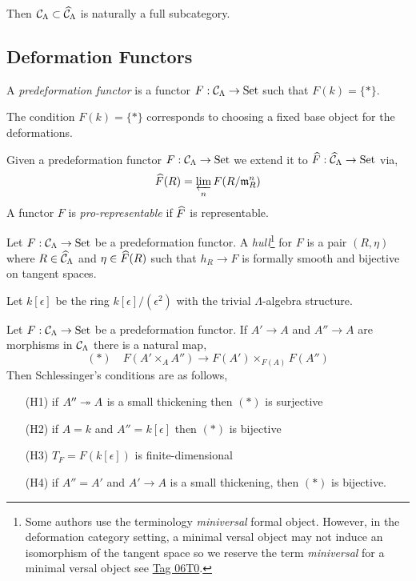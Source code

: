 \documentclass[12pt]{article}
\begin{document}
\begin{rmk}
Then $\mathcal{C}_{\Lambda} \subset \widehat{\mathcal{C}}_{\Lambda}$ is naturally a full subcategory. 
\end{rmk}

\subsection{Deformation Functors}

\begin{defn}
A \textit{predeformation functor} is a functor $F : \mathcal{C}_{\Lambda} \to \mathrm{Set}$ such that $F(k) = \{ * \}$.
\end{defn}

\begin{rmk}
The condition $F(k) = \{ * \}$ corresponds to choosing a fixed base object for the deformations.
\end{rmk}

\begin{defn}
Given a predeformation functor $F : \mathcal{C}_{\Lambda} \to \mathrm{Set}$ we extend it to $\widehat{F} : \widehat{\mathcal{C}}_{\Lambda} \to \mathrm{Set}$ via,
\[ \widehat{F}(R) = \varprojlim_n F(R/\mathfrak{m}_R^n) \]
A functor $F$ is \textit{pro-representable} if $\widehat{F}$ is representable.
\end{defn}

\begin{defn}
Let $F : \mathcal{C}_\Lambda \to \mathrm{Set}$ be a predeformation functor. A \textit{hull}\footnote{Some authors use the terminology \textit{miniversal} formal object. However, in the deformation category setting, a minimal versal object may not induce an isomorphism of the tangent space so we reserve the term \textit{miniversal} for a minimal versal object see \href{https://stacks.math.columbia.edu/tag/06T0}{Tag 06T0}.} for $F$ is a pair $(R, \eta)$ where $R \in \widehat{\mathcal{C}}_{\Lambda}$ and $\eta \in \widehat{F}(R)$ such that $h_R \to F$ is formally smooth and bijective on tangent spaces.
\end{defn}

\begin{rmk}
Let $k[\epsilon]$ be the ring $k[\epsilon]/(\epsilon^2)$ with the trivial $\Lambda$-algebra structure. 
\end{rmk}

\begin{defn}
Let $F : \mathcal{C}_\Lambda \to \mathrm{Set}$ be a predeformation functor. If $A' \to A$ and $A'' \to A$ are morphisms in $\mathcal{C}_\Lambda$ there is a natural map,
\[ (*) \quad F(A' \times_A A'') \to F(A') \times_{F(A)} F(A'') \]
Then Schlessinger's conditions are as follows,
\begin{enumerate}
\item[(H1)] if $A'' \twoheadrightarrow A$ is a small thickening then $(*)$ is surjective
\item[(H2)] if $A = k$ and $A'' = k[\epsilon]$ then $(*)$ is bijective
\item[(H3)] $T_F = F(k[\epsilon])$ is finite-dimensional
\item[(H4)] if $A'' = A'$ and $A' \to A$ is a small thickening, then $(*)$ is bijective.
\end{enumerate}
\end{defn}
\end{document}
